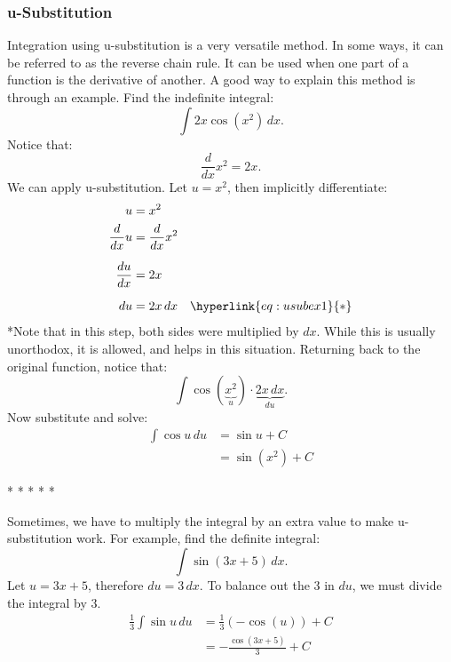 \documentclass[12pt]{article}
\begin{document}
            \subsubsection{u-Substitution}
                Integration using u-substitution is a very versatile method. In some ways, it can be referred to as the reverse chain rule. It can be used when one part of a function is the derivative of another. A good way to explain this method is through an example.
                \newline \newline
                Find the indefinite integral:
                \[ \int 2x \cos(x^2) \, dx. \]
                \newline
                Notice that:
                \[ \frac{d}{dx} x^2 = 2x. \]
                We can apply u-substitution. Let $u = x^2$, then implicitly differentiate:
                \begin{align*}
                    u &= x^2 \\
                    \frac{d}{dx} u &= \frac{d}{dx} x^2 \\[6pt]
                    \frac{du}{dx} &= 2x \\[6pt]
                    du &= 2x \, dx \quad \hyperlink{eq:usubex1}{*}
                \end{align*}
                \hypertarget{eq:usubex1}{*}Note that in this step, both sides were multiplied by $dx$. While this is usually unorthodox, it is allowed, and helps in this situation.
                \newline \newline
                Returning back to the original function, notice that:
                \[ \int \cos(\underbrace{x^2}_{u}) \cdot \underbrace{2x \, dx}_{du}. \]
                Now substitute and solve:
                \begin{align*}
                    \int \cos{u} \, du &= \sin{u} + C\\
                    &= \sin(x^2) + C
                \end{align*}
                \begin{center}
                    * * * * *
                \end{center}
                Sometimes, we have to multiply the integral by an extra value to make u-substitution work. For example, find the definite integral:
                \[ \int \sin(3x+5) \, dx. \]
                Let $u = 3x+5$, therefore $du = 3 \, dx$. To balance out the $3$ in $du$, we must divide the integral by $3$.
                \begin{align*}
                    \frac{1}{3} \int \sin{u} \, du &= \frac{1}{3} \left( -\cos(u) \right) + C \\[6pt]
                    &= -\frac{\cos(3x+5)}{3} + C
                \end{align*}
\end{document}
